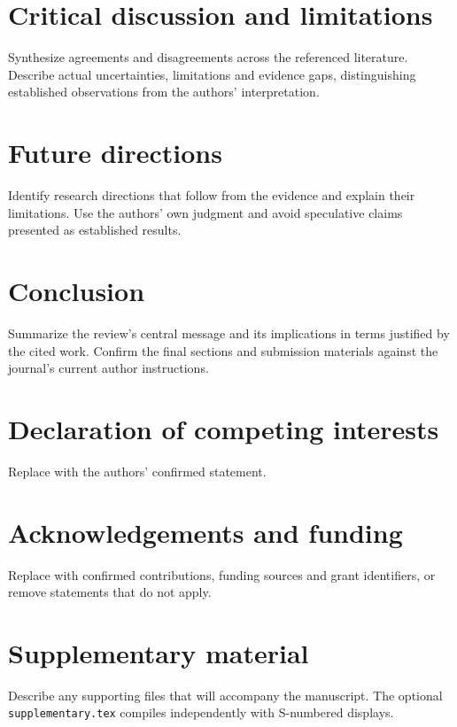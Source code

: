 \documentclass[review,12pt]{elsarticle}
\begin{document}
\section{Critical discussion and limitations}\label{sec:discussion}
Synthesize agreements and disagreements across the referenced literature.
Describe actual uncertainties, limitations and evidence gaps, distinguishing
established observations from the authors' interpretation.

\section{Future directions}\label{sec:future}
Identify research directions that follow from the evidence and explain their
limitations. Use the authors' own judgment and avoid speculative claims
presented as established results.

\section{Conclusion}\label{sec:conclusion}
Summarize the review's central message and its implications in terms justified
by the cited work. Confirm the final sections and submission materials against
the journal's current author instructions.

\section*{Declaration of competing interests}
Replace with the authors' confirmed statement.
\section*{Acknowledgements and funding}
Replace with confirmed contributions, funding sources and grant identifiers,
or remove statements that do not apply.
\section*{Supplementary material}
Describe any supporting files that will accompany the manuscript. The optional
\texttt{supplementary.tex} compiles independently with S-numbered displays.



\end{document}
